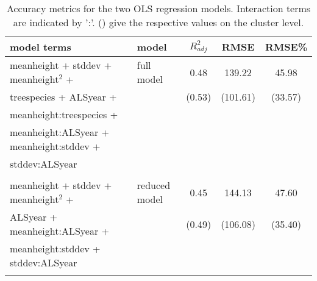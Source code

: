 \begin{table*}[!htbp]
	\begin{center}
	\caption{Accuracy metrics for the two OLS regression models. Interaction terms are indicated by ':'. () give the respective values on the cluster level.} 
	\label{tab:modacc_modterms}
    {\small %
	\begin{tabular}{llccc}
  \hline
model terms & model & $R^2_{adj}$ & RMSE & RMSE\% \\ 
  \hline
meanheight + stddev + meanheight$^2$ +  & full model &  0.48 & 139.22  & 45.98 \\
treespecies + ALSyear + & & (0.53) &  (101.61) & (33.57) \\ 
meanheight:treespecies + \\ meanheight:ALSyear + meanheight:stddev + \\ stddev:ALSyear &&& \\ \\

meanheight + stddev + meanheight$^2$ + & reduced model  & 0.45  & 144.13 & 47.60 \\
ALSyear + meanheight:ALSyear + & & (0.49) & (106.08) & (35.40) \\
meanheight:stddev + stddev:ALSyear &&& \\ \\
\hline
\hline
\end{tabular}
}%
\end{center}
\end{table*}

